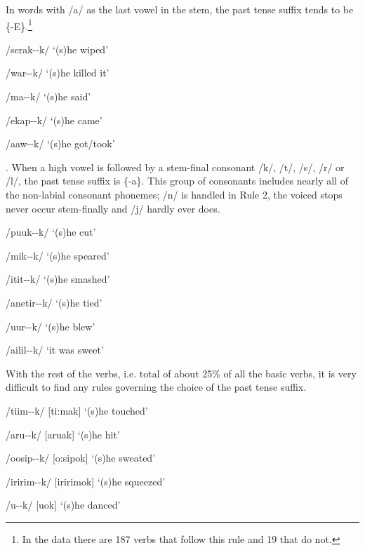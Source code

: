 In words with /a/ as the last vowel in the stem, the past tense suffix tends to be \{\nobreakdash-E\}.\footnote{In the data there are 187 verbs that follow this rule and 19 that do not.}


/serak--k/  `(s)he wiped'

/war--k/  `(s)he killed it'

/ma--k/  `(s)he said'

/ekap--k/  `(s)he came'

/aaw--k/  `(s)he got/took'

. When a high vowel is followed by a stem-final consonant /k/, /t/, /s/, /r/ or /l/, the past tense suffix is \{-a\}.  This group of consonants includes nearly all of the non-labial consonant phonemes; /n/ is handled in Rule 2, the voiced stops never occur stem-finally and /j/ hardly ever does.  

/puuk--k/  `(s)he cut'

/mik--k/  `(s)he speared'

/itit--k/  `(s)he smashed'

/anetir--k/  `(s)he tied'

/{\textphi}uur--k/  `(s)he blew'

/a{\textphi}ilil--k/  `it was sweet'

With the rest of the verbs, i.e. total of about 25\% of all the basic verbs, it is very difficult to find any rules governing the choice of the past tense suffix.

/tiim--k/  [{{\textprimstress}ti:mak}]  `(s)he touched'

/aru{\textphi}--k/  [a{{\textprimstress}ru}{\textphi}ak]  `(s)he hit'

/oosip--k/  [{{\textprimstress}o:sipok}]  `(s)he sweated'

/{\textphi}iririm--k/  [{\textphi}i{{\textprimstress}ririmok}]  `(s)he squeezed'

/u{\textphi}--k/  [u{\textphi}{{\textprimstress}ok}]  `(s)he danced'


